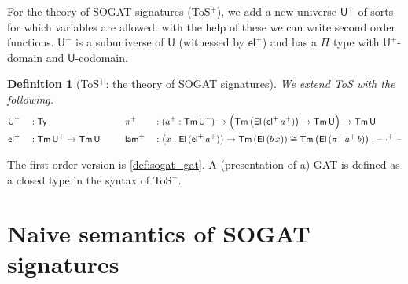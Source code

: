 \documentclass[10pt,a4paper]{amsart}
\newtheorem{definition}[theorem]{Definition}
\newcommand{\Ty}{\mathsf{Ty}}
\newcommand{\Tm}{\mathsf{Tm}}
\newcommand{\U}{\mathsf{U}}
\newcommand{\El}{\mathsf{El}}
\newcommand{\ra}{\rightarrow}
\newcommand{\blank}{\mathord{\hspace{1pt}\text{--}\hspace{1pt}}} %
\newcommand{\lam}{\mathsf{lam}}
\newcommand{\el}{\mathsf{el}}
\begin{document}
\setcounter{theorem}{12}
For the theory of SOGAT signatures (ToS$^+$), we add a new universe $\U^+$ of sorts for which
variables are allowed: with the help of these we can write second
order functions. $\U^+$ is a subuniverse of $\U$ (witnessed by
$\el^+$) and has a $\Pi$ type with $\U^+$-domain and $\U$-codomain.
\begin{definition}[ToS$^+$: the theory of SOGAT signatures]\label{def:sogat}
  We extend ToS with the following.
  \begin{alignat*}{10}
    & \U^+ && : \Ty                                   && \pi^+ && : (a^+ : \Tm\,\U^+)\ra\Big(\Tm\,\big(\El\,(\el^+\,a^+)\big)\ra\Tm\,\U\Big)\ra\Tm\,\U \\                                          
    & \el^+ && : \Tm\,\U^+ \ra \Tm\,\U \hspace{1.7em} && \lam^+ && : \big(x:\El\,(\el^+\,a^+)\big)\ra\Tm\,(\El\,(b\,x))\cong\Tm\,\big(\El\,(\pi^+\,a^+\,b)\big) : \blank\cdot^+\blank    
  \end{alignat*}
\end{definition}
The first-order version is \autoref{def:sogat_gat}. A (presentation of
a) GAT is defined as a closed type in the syntax of ToS$^+$.

\setcounter{theorem}{13}
\section{Naive semantics of SOGAT signatures}
\label{sec:naive}
\end{document}
